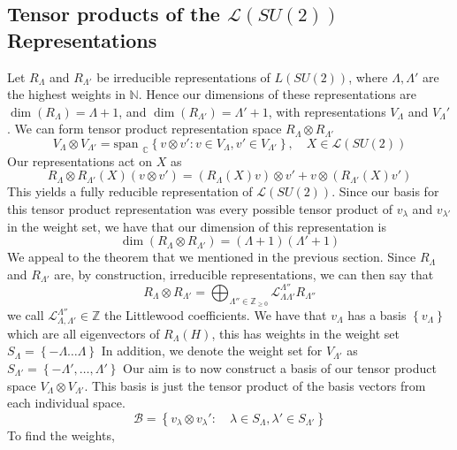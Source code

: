 \subsection{Tensor products of the $\mathcal{ L } ( SU ( 2) ) $ Representations} 
Let $ R _ \Lambda $ and $ R _{ \Lambda ' } $ be irreducible representations 
of $ L ( SU ( 2 ) )$, where  $ \Lambda , \Lambda ' $ are the highest weights 
in $ \mathbb{ N } $. Hence our dimensions of these representations
are $ \dim ( R _ \Lambda ) = \Lambda + 1 $, and 
$ \dim ( R _{ \Lambda ' } ) = \Lambda ' + 1 $, with representations 
$ V _\Lambda $ and $ V _ \Lambda' $.
We can form tensor product representation space 
$ R _ \Lambda \otimes R _{ \Lambda ' }$ 
\[
 V _{ \Lambda } \otimes V _{ \Lambda ' } 
 = \text{span } _{ \mathbb{ C } } \left\{ v \otimes v ' : 
 v \in V _{ \Lambda } , v ' \in V _{ \Lambda ' }\right\}  , \quad 
 X \in  \mathcal{ L } ( SU ( 2) ) 
\] Our representations 
act on $ X $ as 
\[
	R _{ \Lambda } \otimes R _{ \Lambda ' } ( X) ( v \otimes v ' ) 
	= ( R _ \Lambda ( X) v ) \otimes v ' + v \otimes ( R _{ \Lambda ' } ( X) v ') 
\] This yields a fully reducible representation 
of $ \mathcal{ L } ( SU ( 2) ) $. Since our 
basis for this tensor product representation 
was every possible tensor product 
of $ v _ \lambda $ and $ v _{ \lambda ' } $ in 
the weight set, we have that our dimension of 
this representation is 
\[
	\dim ( R _{ \Lambda } \otimes R_{ \Lambda ' } ) = ( \Lambda + 1 ) ( \Lambda '  +1 ) 
\] We appeal to the theorem that we mentioned 
in the previous section. Since $ R _ \Lambda $ and 
$ R _{ \Lambda ' } $ are, by construction, irreducible 
representations, we can then say that 
\[ R _ \Lambda \otimes R_{ \Lambda ' } = \bigoplus_{ \Lambda ''  \in \mathbb{ Z }_{ \geq 0 }}
	\mathcal{ L } ^{ \Lambda '' } _{ \Lambda \Lambda ' } R _{ \Lambda '' }	
\] we call $ \mathcal{ L } ^{ \Lambda '' } _{ \Lambda , \Lambda ' } \in \mathbb{ Z}  $ 
the Littlewood coefficients. 
We have that $ v _{ \Lambda } $ has a basis $ \left\{  v _{ \Lambda}  \right\}  $
which are all eigenvectors of $ R _{ \Lambda } ( H ) $, 
this has weights in the weight set $ S_{ \Lambda } = \left\{   - \Lambda \dots \Lambda  \right\} $
In addition, we denote the weight set for $ V _{ \Lambda ' }$
as $ S _{ \Lambda ' } = \left\{  - \Lambda ' , \dots , \Lambda'  \right\} $
Our aim is to now construct a basis of our 
tensor product space $ V _{ \Lambda } \otimes V _{ \Lambda ' }$. 
This basis is just the tensor product of the 
basis vectors from each individual space. 
 \[
 \mathcal{ B } =\left\{  v_{ \lambda } \otimes v_\lambda ' : \quad 
 \lambda \in S _{ \Lambda },  \lambda' \in S_{ \Lambda ' } \right\}
\] To find the weights, 
